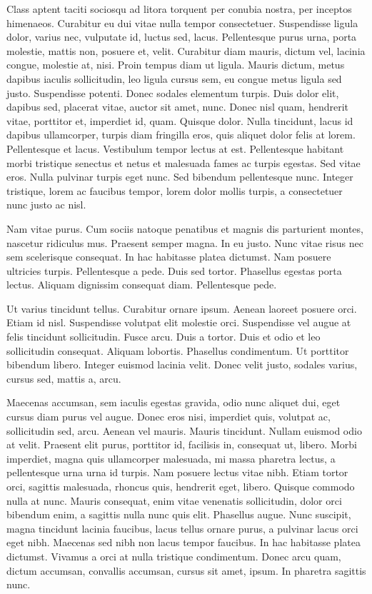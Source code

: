 \documentclass[../hdr.tex]{subfiles}
\begin{document}
Class aptent taciti sociosqu ad litora torquent per conubia nostra, per inceptos
himenaeos. Curabitur eu dui vitae nulla tempor consectetuer. Suspendisse ligula
dolor, varius nec, vulputate id, luctus sed, lacus. Pellentesque purus urna,
porta molestie, mattis non, posuere et, velit. Curabitur diam mauris, dictum
vel, lacinia congue, molestie at, nisi. Proin tempus diam ut ligula. Mauris
dictum, metus dapibus iaculis sollicitudin, leo ligula cursus sem, eu congue
metus ligula sed justo. Suspendisse potenti. Donec sodales elementum turpis.
Duis dolor elit, dapibus sed, placerat vitae, auctor sit amet, nunc. Donec nisl
quam, hendrerit vitae, porttitor et, imperdiet id, quam. Quisque dolor. Nulla
tincidunt, lacus id dapibus ullamcorper, turpis diam fringilla eros, quis
aliquet dolor felis at lorem. Pellentesque et lacus. Vestibulum tempor lectus at
est. Pellentesque habitant morbi tristique senectus et netus et malesuada fames
ac turpis egestas. Sed vitae eros. Nulla pulvinar turpis eget nunc. Sed bibendum
pellentesque nunc. Integer tristique, lorem ac faucibus tempor, lorem dolor
mollis turpis, a consectetuer nunc justo ac nisl.

Nam vitae purus. Cum sociis natoque penatibus et magnis dis parturient montes,
nascetur ridiculus mus. Praesent semper magna. In eu justo. Nunc vitae risus nec
sem scelerisque consequat. In hac habitasse platea dictumst. Nam posuere
ultricies turpis. Pellentesque a pede. Duis sed tortor. Phasellus egestas porta
lectus. Aliquam dignissim consequat diam. Pellentesque pede.

Ut varius tincidunt tellus. Curabitur ornare ipsum. Aenean laoreet posuere orci.
Etiam id nisl. Suspendisse volutpat elit molestie orci. Suspendisse vel augue at
felis tincidunt sollicitudin. Fusce arcu. Duis a tortor. Duis et odio et leo
sollicitudin consequat. Aliquam lobortis. Phasellus condimentum. Ut porttitor
bibendum libero. Integer euismod lacinia velit. Donec velit justo, sodales
varius, cursus sed, mattis a, arcu.

Maecenas accumsan, sem iaculis egestas gravida, odio nunc aliquet dui, eget
cursus diam purus vel augue. Donec eros nisi, imperdiet quis, volutpat ac,
sollicitudin sed, arcu. Aenean vel mauris. Mauris tincidunt. Nullam euismod odio
at velit. Praesent elit purus, porttitor id, facilisis in, consequat ut, libero.
Morbi imperdiet, magna quis ullamcorper malesuada, mi massa pharetra lectus, a
pellentesque urna urna id turpis. Nam posuere lectus vitae nibh. Etiam tortor
orci, sagittis malesuada, rhoncus quis, hendrerit eget, libero. Quisque commodo
nulla at nunc. Mauris consequat, enim vitae venenatis sollicitudin, dolor orci
bibendum enim, a sagittis nulla nunc quis elit. Phasellus augue. Nunc suscipit,
magna tincidunt lacinia faucibus, lacus tellus ornare purus, a pulvinar lacus
orci eget nibh. Maecenas sed nibh non lacus tempor faucibus. In hac habitasse
platea dictumst. Vivamus a orci at nulla tristique condimentum. Donec arcu quam,
dictum accumsan, convallis accumsan, cursus sit amet, ipsum. In pharetra
sagittis nunc.
\end{document}
